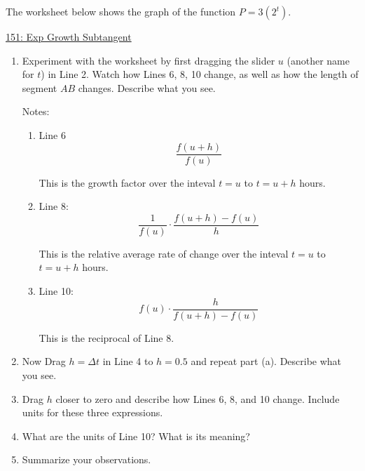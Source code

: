 \documentclass{ximera}
\begin{document}
\begin{exploration} \label{EKDFeredfM}
The worksheet below shows the graph of the function $P=3(2^t)$. 

\href{https://www.desmos.com/calculator/zu0f4jnh4a}{151: Exp Growth Subtangent}

 
\begin{onlineOnly}
    \begin{center}
\end{center}
\end{onlineOnly}


\begin{enumerate}
\item Experiment with the worksheet by first dragging the slider $u$ (another name for $t$) in Line 2. Watch how Lines 6, 8, 10 change, as well as how the length of segment $AB$ changes. Describe what you see.
\begin{freeResponse}
\end{freeResponse}

Notes:

\begin{enumerate}
\item Line 6
\[
\frac{f(u+h)}{f(u)}
\]

This is the growth factor over the inteval $t=u$ to $t=u+h$ hours.

\item Line 8: 
\[
    \frac{1}{f(u)}\cdot \frac{f(u+h)-f(u)}{h}
\]

This is the relative average rate of change over the inteval $t=u$ to $t=u+h$ hours.

\item Line 10:
\[
    f(u) \cdot \frac{h}{f(u+h)-f(u)}
\]

This is the reciprocal of Line 8.
\end{enumerate}


\item Now Drag $h=\Delta t$ in Line 4 to $h=0.5$ and repeat part (a). Describe what you see.
\begin{freeResponse}
\end{freeResponse}

\item Drag $h$ closer to zero and describe how Lines 6, 8, and 10 change. Include units for these three expressions.

\item What are the units of Line 10? What is its meaning?
\begin{freeResponse}
\end{freeResponse}

\item Summarize your observations.
\begin{freeResponse}
\end{freeResponse}

\end{enumerate}
\end{exploration}
\end{document}
